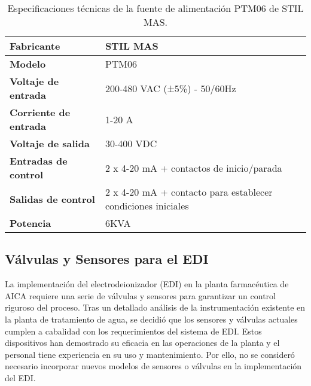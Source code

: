\begin{table}[H]
    \centering
    \caption{Especificaciones técnicas de la fuente de alimentación PTM06 de STIL MAS.}
    \label{table:power_supply_specs}
    \begin{tabular}{| L{6cm} | L{6cm} |}
        \hline
        \textbf{Fabricante} & STIL MAS  \\
        \hline
        \textbf{Modelo} & PTM06 \\
        \hline
        \textbf{Voltaje de entrada} & 200-480 VAC (±5\%) - 50/60Hz \\
        \hline
        \textbf{Corriente de entrada} & 1-20 A \\
        \hline
        \textbf{Voltaje de salida} & 30-400 VDC \\
        \hline
        \textbf{Entradas de control} & 2 x 4-20 mA + contactos de inicio/parada \\
        \hline
        \textbf{Salidas de control} & 2 x 4-20 mA + contacto para establecer condiciones iniciales \\
        \hline
        \textbf{Potencia} & 6KVA \\
        \hline
    \end{tabular}
\end{table}



\subsection{Válvulas y Sensores para el EDI}

La implementación del electrodeionizador (EDI) en la planta farmacéutica de AICA requiere una serie de válvulas y sensores para garantizar un control riguroso del proceso. Tras un detallado análisis de la instrumentación existente en la planta de tratamiento de agua, se decidió que los sensores y válvulas actuales cumplen a cabalidad con los requerimientos del sistema de EDI. Estos dispositivos han demostrado su eficacia en las operaciones de la planta y el personal tiene experiencia en su uso y mantenimiento. Por ello, no se consideró necesario incorporar nuevos modelos de sensores o válvulas en la implementación del EDI.

